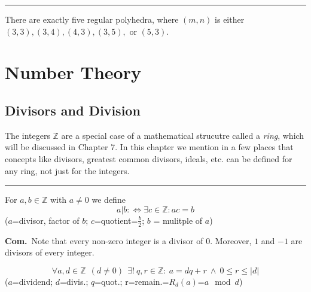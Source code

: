 \documentclass[a4paper]{extarticle}
\newcommand{\Com}{\textbf{Com.}\ }
\newcommand{\Z}{\mathbb{Z}}
\newcommand{\abs}[1]{\lvert #1 \rvert}
\newcommand{\sep}{\vspace{5pt}\noindent\hrule\vspace{5pt}}
\begin{document}
\begin{multicols*}{2}
\sep

\Thm There are exactly five regular polyhedra, where $(m,n)$ is either
$(3,3),(3,4),(4,3),(3,5), \text{ or }(5,3)$. 

\begin{table}[H]
\end{table}



\section{Number Theory}

\subsection{Divisors and Division}

The integers $\mathbb{Z}$ are a special case of a mathematical strucutre called
a \emph{ring}, which will be discussed in Chapter 7. In this chapter we mention
in a few places that concepts like divisors, greatest common divisors, ideals,
etc. can be defined for any ring, not just for the integers.

\sep

\Def[Divisibility] For $a,b\in \Z$ with $a\neq 0$ we define
\[
a|b :\Longleftrightarrow \exists c\in\Z \colon ac=b
\]
($a$=divisor, factor of $b$; $c$=quotient=$\tfrac{b}{2}$; $b$ = mulitple of $a$)

\Com Note that every non-zero integer is a divisor of $0$. Moreover, $1$ and $-1$ are
divisors of every integer.

\[
\forall a,d\in\Z \ \ (d\neq 0) \ \ \exists! \ q,r\in\Z\colon 
\ a=dq+r \ \land \ 0\leq r \leq \abs{d}
\]
($a$=dividend; $d$=divis.; $q$=quot.; r=remain.=$R_d(a)$=$a\mod d$)


\end{multicols*}
\end{document}
